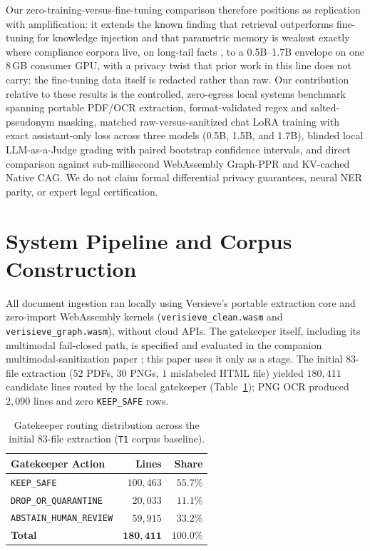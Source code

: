 \documentclass{article}
\begin{document}
Our zero-training-versus-fine-tuning comparison therefore positions as replication with amplification: it extends the known finding that retrieval outperforms fine-tuning for knowledge injection \citep{ovadia2023finetuning} and that parametric memory is weakest exactly where compliance corpora live, on long-tail facts \citep{mallen2023when,kandpal2023longtail}, to a 0.5B--1.7B envelope on one 8\,GB consumer GPU, with a privacy twist that prior work in this line does not carry: the fine-tuning data itself is redacted rather than raw. Our contribution relative to these results is the controlled, zero-egress local systems benchmark spanning portable PDF/OCR extraction, format-validated regex and salted-pseudonym masking, matched raw-versus-sanitized chat LoRA training with exact assistant-only loss across three models (0.5B, 1.5B, and 1.7B), blinded local LLM-as-a-Judge grading with paired bootstrap confidence intervals, and direct comparison against sub-millisecond WebAssembly Graph-PPR and KV-cached Native CAG. We do not claim formal differential privacy guarantees, neural NER parity, or expert legal certification.

\section{System Pipeline and Corpus Construction}
\label{sec:corpus}

All document ingestion ran locally using Versieve's portable extraction core and zero-import WebAssembly kernels (\texttt{verisieve\_clean.wasm} and \texttt{verisieve\_graph.wasm}), without cloud APIs. The gatekeeper itself, including its multimodal fail-closed path, is specified and evaluated in the companion multimodal-sanitization paper \citep{ardiyansyah2026multimodal}; this paper uses it only as a stage. The initial $83$-file extraction ($52$ PDFs, $30$ PNGs, $1$ mislabeled HTML file) yielded $180{,}411$ candidate lines routed by the local gatekeeper (Table~\ref{tab:extraction}); PNG OCR produced $2{,}090$ lines and zero \texttt{KEEP\_SAFE} rows.

\begin{table}[t]
\caption{Gatekeeper routing distribution across the initial $83$-file extraction (\texttt{T1} corpus baseline).}
\label{tab:extraction}
\vskip 0.08in
\begin{center}
\begin{tabular}{lrr}
\toprule
\textbf{Gatekeeper Action} & \textbf{Lines} & \textbf{Share} \\
\midrule
\texttt{KEEP\_SAFE} & $100{,}463$ & $55.7\%$ \\
\texttt{DROP\_OR\_QUARANTINE} & $20{,}033$ & $11.1\%$ \\
\texttt{ABSTAIN\_HUMAN\_REVIEW} & $59{,}915$ & $33.2\%$ \\
\midrule
\textbf{Total} & $\mathbf{180{,}411}$ & $\mathbf{100.0\%}$ \\
\bottomrule
\end{tabular}
\end{center}
\vskip -0.14in
\end{table}
\end{document}
